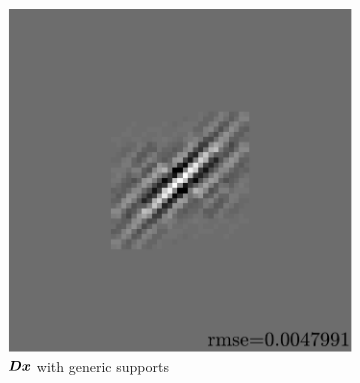 \begin{figure}[!ht]
\begin{subfigure}[b]{0.085\textwidth}
	\caption{}
\end{subfigure}
\begin{subfigure}[b]{0.39\textwidth}\centering
	\includegraphics[width=\textwidth]{figures/exple-better-support/xp_128x128_sc2_angl1_K3_S3_node4classic_approx.pdf}
	\caption{$\bm{D}\bm{x}$ with generic supports}\label{fig_xp_fixed_vs_expected_approx1}
\end{subfigure}
\begin{subfigure}[b]{0.085\textwidth}\centering

\end{subfigure}
\end{figure}
